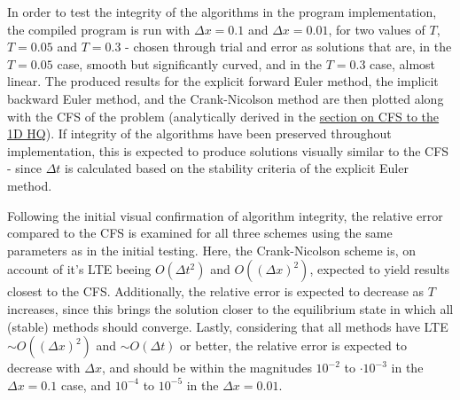 \documentclass[%
oneside,                 %
final,                   %
10pt]{article}
\begin{document}
In order to test the integrity of the algorithms in the program implementation, the compiled program is run with $\Delta x=0.1$ and $\Delta x=0.01$, for two values of $T$, $T=0.05$ and $T=0.3$ - chosen through trial and error as solutions that are, in the $T=0.05$ case, smooth but significantly curved, and in the $T=0.3$ case, almost linear. The produced results for the explicit forward Euler method, the implicit backward Euler method, and the Crank-Nicolson method are then plotted along with the CFS of the problem (analytically derived in the \hyperref[M.CFS1d]{section on CFS to the 1D HQ}). If integrity of the algorithms have been preserved throughout implementation, this is expected to produce solutions visually similar to the CFS - since $\Delta t$ is calculated based on the stability criteria of the explicit Euler method. \newline

Following the initial visual confirmation of algorithm integrity, the relative error compared to the CFS is examined for all three schemes using the same parameters as in the initial testing. Here, the Crank-Nicolson scheme is, on account of it's LTE beeing $O(\Delta t^2)$ and $O((\Delta x)^2)$, expected to yield results closest to the CFS. Additionally, the relative error is expected to decrease as $T$ increases, since this brings the solution closer to the equilibrium state in which all (stable) methods should converge. Lastly, considering that all methods have LTE $\sim O((\Delta x)^2)$ and $\sim O(\Delta t)$ or better, the relative error is expected to decrease with $\Delta x$, and should be within the magnitudes $ 10^{-2}$ to $\cdot 10^{-3}$  in the $\Delta x=0.1$ case, and $10^{-4}$ to $10^{-5}$ in the $\Delta x=0.01$.
\end{document}
